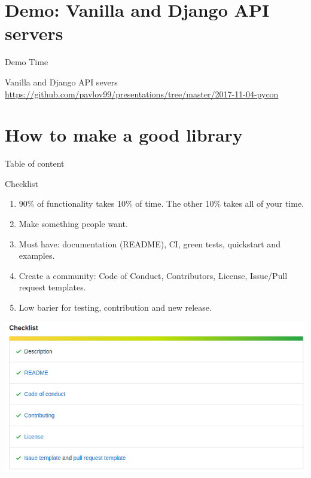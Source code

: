 \documentclass[unicode, notheorems, aspectratio=169]{beamer}
\begin{document}
\section{Demo: Vanilla and Django API servers}
\begin{frame}
\begin{center}
		{\huge Demo Time}
		
		\vspace{5mm}
		Vanilla and Django API severs \\
		\href{https://github.com/pavlov99/presentations/tree/master/2017-11-04-pycon}{https://github.com/pavlov99/presentations/tree/master/2017-11-04-pycon}
	\end{center}
\end{frame}

\section{How to make a good library}
\begin{frame}{Table of content}
	\tableofcontents[currentsection]
\end{frame}

\begin{frame}{Checklist}
\begin{enumerate}
\item 90\% of functionality takes 10\% of time. The other 10\% takes all of your time.
\item Make something people want.
\item Must have: documentation (README), CI, green tests, quickstart and examples.
\item Create a community: Code of Conduct, Contributors, License, Issue/Pull request templates.
\item Low barier for testing, contribution and new release.
\end{enumerate}
\end{frame}

\begin{frame}
\begin{center}
	\includegraphics[width=.95\paperwidth]{./images/community-profile} 
\end{center}
\end{frame}
\end{document}
